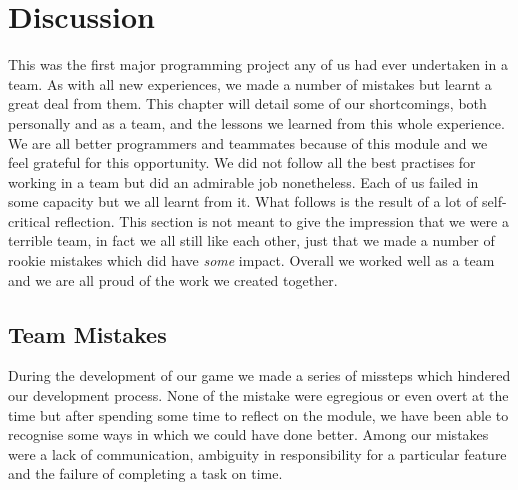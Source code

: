 \chapter{Discussion}
\label{chap:discussion}

%
%
%

This was the first major programming project any of us had ever
undertaken in a team. As with all new experiences, we made a number of
mistakes but learnt a great deal from them. This chapter will detail
some of our shortcomings, both personally and as a team, and the
lessons we learned from this whole experience. We are all better
programmers and teammates because of this module and we feel grateful
for this opportunity. We did not follow all the best practises for
working in a team but did an admirable job nonetheless. Each of us
failed in some capacity but we all learnt from it. What follows is the
result of a lot of self-critical reflection. This section is not meant
to give the impression that we were a terrible team, in fact we all
still like each other, just that we made a number of rookie mistakes
which did have \emph{some} impact. Overall we worked well as a team
and we are all proud of the work we created together.

\section{Team Mistakes}

During the development of our game we made a series of missteps which
hindered our development process. None of the mistake were egregious
or even overt at the time but after spending some time to reflect on
the module, we have been able to recognise some ways in which we could
have done better. Among our mistakes were a lack of communication,
ambiguity in responsibility for a particular feature and the failure
of completing a task on time.

